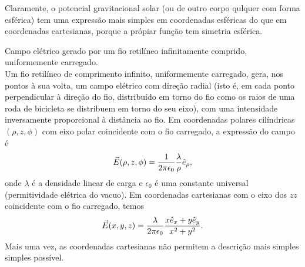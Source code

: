 \begin{examples}
  Claramente, o potencial gravitacional solar (ou de outro corpo qulquer com
  forma esférica) tem uma expressão mais simples em coordenadas esféricas do que
  em coordenadas cartesianas, porque a própiar função tem simetria esférica.
\item
  Campo elétrico gerado por um fio retilíneo infinitamente comprido,
  uniformemente carregado.\\
  Um fio retilíneo de comprimento infinito, uniformemente carregado, gera, nos
  pontos à sua volta, um campo elétrico com direção radial (isto é, em cada
  ponto perpendicular à direção do fio, distribuído em torno do fio como os
  raios de uma roda de bicicleta se distribuem em torno do seu eixo), com uma
  intensidade inversamente proporcional à distância ao fio. Em coordenadas
  polares cilíndricas $(\rho,z,\phi)$ com eixo polar coincidente com o fio
  carregado, a expressão do campo é
  \begin{equation*}
    \vec E(\rho,z,\phi)=\frac{1}{2\pi\epsilon_0}\frac{\lambda}{\rho}\he_\rho,
  \end{equation*}
  onde $\lambda$ é a densidade linear de carga e $\epsilon_0$ é uma constante
  universal (permitividade elétrica do vacuo).
  Em coordenadas cartesianas com o eixo dos $zz$ coincidente com o fio
  carregado, temos
  \begin{equation*}
    \vec E(x,y,z)=\frac{\lambda}{2\pi\epsilon_0}\frac{x\he_x+y\he_y}{x^2+y^2}.
  \end{equation*}
  Mais uma vez, as coordenadas cartesianas não permitem a descrição mais simples
  simples possível.
\end{examples}

